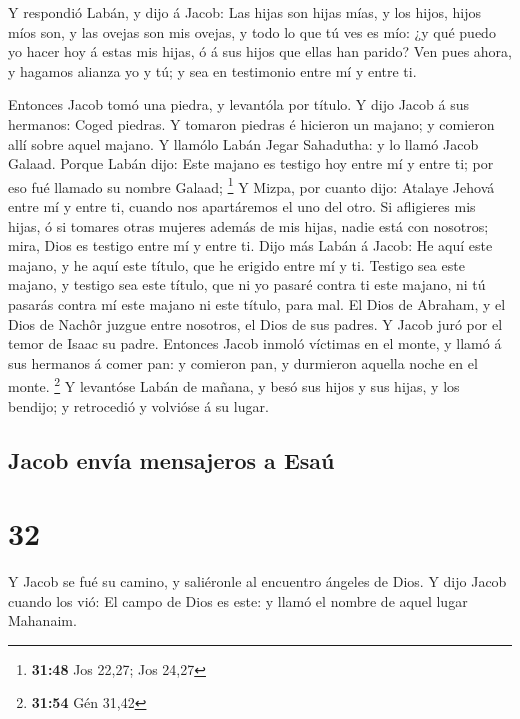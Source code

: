  Y respondió Labán, y dijo á Jacob: Las hijas son hijas
mías, y los hijos, hijos míos son, y las ovejas son mis ovejas, y todo
lo que tú ves es mío: ¿y qué puedo yo hacer hoy á estas mis hijas, ó á
sus hijos que ellas han parido?  Ven pues ahora, y
hagamos alianza yo y tú; y sea en testimonio entre mí y entre ti.

 Entonces Jacob tomó una piedra, y levantóla por título.
 Y dijo Jacob á sus hermanos: Coged piedras. Y tomaron
piedras é hicieron un majano; y comieron allí sobre aquel majano.
 Y llamólo Labán Jegar Sahadutha: y lo llamó Jacob
Galaad.  Porque Labán dijo: Este majano es testigo hoy
entre mí y entre ti; por eso fué llamado su nombre Galaad; \footnote{\textbf{31:48}
  Jos 22,27; Jos 24,27}  Y Mizpa, por cuanto dijo:
Atalaye Jehová entre mí y entre ti, cuando nos apartáremos el uno del
otro.  Si afligieres mis hijas, ó si tomares otras
mujeres además de mis hijas, nadie está con nosotros; mira, Dios es
testigo entre mí y entre ti.  Dijo más Labán á Jacob: He
aquí este majano, y he aquí este título, que he erigido entre mí y ti.
 Testigo sea este majano, y testigo sea este título, que
ni yo pasaré contra ti este majano, ni tú pasarás contra mí este majano
ni este título, para mal.  El Dios de Abraham, y el Dios
de Nachôr juzgue entre nosotros, el Dios de sus padres. Y Jacob juró por
el temor de Isaac su padre.  Entonces Jacob inmoló
víctimas en el monte, y llamó á sus hermanos á comer pan: y comieron
pan, y durmieron aquella noche en el monte. \footnote{\textbf{31:54} Gén
  31,42}  Y levantóse Labán de mañana, y besó sus hijos y
sus hijas, y los bendijo; y retrocedió y volvióse á su lugar.

\hypertarget{jacob-envuxeda-mensajeros-a-esauxfa}{%
\subsection{Jacob envía mensajeros a
Esaú}\label{jacob-envuxeda-mensajeros-a-esauxfa}}

\hypertarget{section-31}{%
\section{32}\label{section-31}}

 Y Jacob se fué su camino, y saliéronle al encuentro
ángeles de Dios.  Y dijo Jacob cuando los vió: El campo de
Dios es este: y llamó el nombre de aquel lugar Mahanaim.

